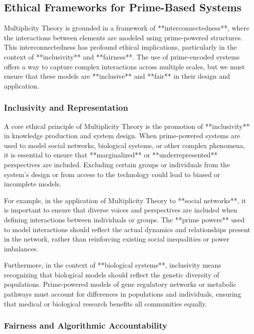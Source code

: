 \documentclass[12pt]{article}
\begin{document}
\subsection{Ethical Frameworks for Prime-Based Systems}

Multiplicity Theory is grounded in a framework of **interconnectedness**, where the interactions between elements are modeled using prime-powered structures. This interconnectedness has profound ethical implications, particularly in the context of **inclusivity** and **fairness**. The use of prime-encoded systems offers a way to capture complex interactions across multiple scales, but we must ensure that these models are **inclusive** and **fair** in their design and application.

\subsubsection{Inclusivity and Representation}

A core ethical principle of Multiplicity Theory is the promotion of **inclusivity** in knowledge production and system design. When prime-powered systems are used to model social networks, biological systems, or other complex phenomena, it is essential to ensure that **marginalized** or **underrepresented** perspectives are included. Excluding certain groups or individuals from the system's design or from access to the technology could lead to biased or incomplete models.

For example, in the application of Multiplicity Theory to **social networks**, it is important to ensure that diverse voices and perspectives are included when defining interactions between individuals or groups. The **prime powers** used to model interactions should reflect the actual dynamics and relationships present in the network, rather than reinforcing existing social inequalities or power imbalances.

Furthermore, in the context of **biological systems**, inclusivity means recognizing that biological models should reflect the genetic diversity of populations. Prime-powered models of gene regulatory networks or metabolic pathways must account for differences in populations and individuals, ensuring that medical or biological research benefits all communities equally.

\subsubsection{Fairness and Algorithmic Accountability}
\end{document}
